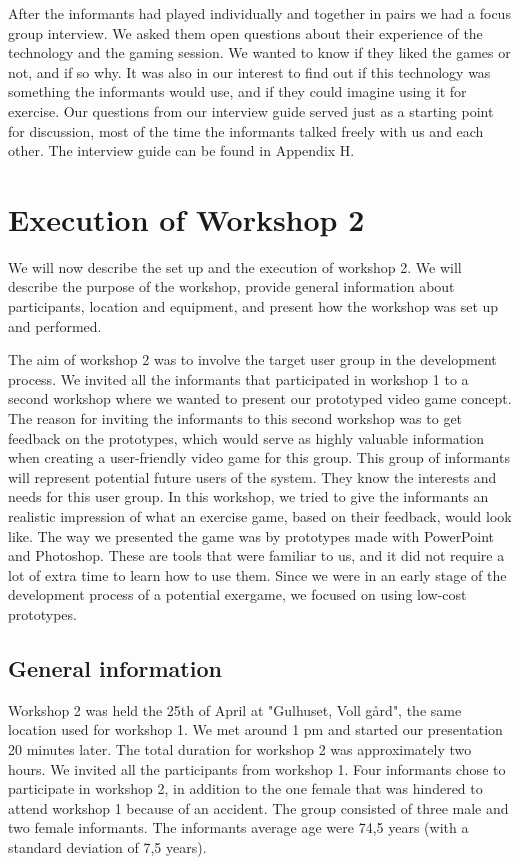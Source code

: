 After the informants had played individually and together in pairs we had a focus group interview. We asked them open questions about their experience of the technology and the gaming session. We wanted to know if they liked the games or not, and if so why. It was also in our interest to find out if this technology was something the informants would use, and if they could imagine using it for exercise. Our questions from our interview guide served just as a starting point for discussion, most of the time the informants talked freely with us and each other. The interview guide can be found in Appendix H.                 

\section{Execution of Workshop 2}
\label{sec:ws2}
We will now describe the set up and the execution of workshop 2. We will describe the purpose of the workshop, provide general information about participants, location and equipment, and present how the workshop was set up and performed. 

The aim of workshop 2 was to involve the target user group in the development process. We invited all the informants that participated in workshop 1 to a second workshop where we wanted to present our prototyped video game concept. The reason for inviting the informants to this second workshop was to get feedback on the prototypes, which would serve as highly valuable information when creating a user-friendly video game for this group. This group of informants will represent potential future users of the system. They know the interests and needs for this user group. In this workshop, we tried to give the informants an realistic impression of what an exercise game, based on their feedback, would look like. The way we presented the game was by prototypes made with PowerPoint and Photoshop. These are tools that were familiar to us, and it did not require a lot of extra time to learn how to use them. Since we were in an early stage of the development process of a potential exergame, we focused on using low-cost prototypes.  

\subsection{General information}
Workshop 2 was held the 25th of April at "Gulhuset, Voll gård", the same location used for workshop 1. We met around 1 pm and started our presentation 20 minutes later. The total duration for workshop 2 was approximately two hours. We invited all the participants from workshop 1. Four informants chose to participate in workshop 2, in addition to the one female that was hindered to attend workshop 1 because of an accident. The group consisted of three male and two female informants. The informants average age were 74,5 years (with a standard deviation of 7,5 years).  

